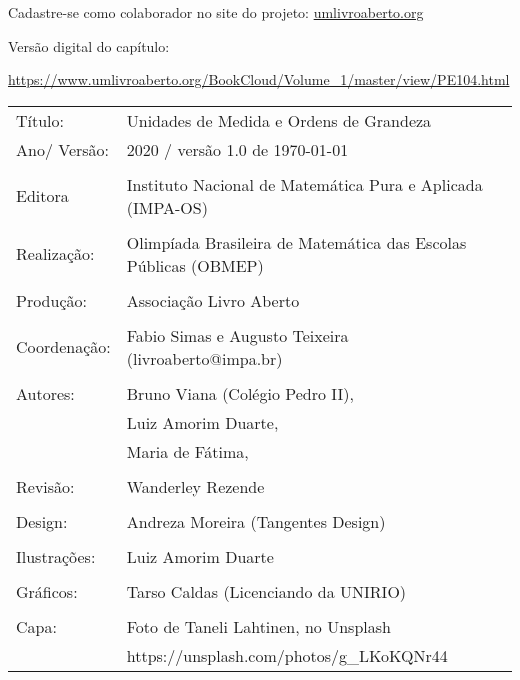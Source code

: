 Cadastre-se como colaborador no site do projeto: \url{umlivroaberto.org}

Versão digital do capítulo:

\url{https://www.umlivroaberto.org/BookCloud/Volume_1/master/view/PE104.html}


\begin{tabular}{p{}p{}}
Título: & Unidades de Medida e Ordens de Grandeza\\
Ano/ Versão: & 2020 / versão 1.0 de \today\\
\\
Editora & Instituto Nacional de Matem\'atica Pura e Aplicada (IMPA-OS)\\
\\
Realização:& Olimp\'iada Brasileira de Matem\'atica das Escolas P\'ublicas (OBMEP)\\
\\
Produção:& Associação Livro Aberto\\
\\
Coordenação: & Fabio Simas e Augusto Teixeira (livroaberto@impa.br)\\
\\
Autores: & Bruno Viana (Colégio Pedro II), \\
 		 & Luiz Amorim Duarte, \\
 		 & Maria de Fátima,\\
\\
Revisão: & Wanderley Rezende \\
\\
Design: & Andreza Moreira (Tangentes Design) \\
\\
Ilustrações: & Luiz Amorim Duarte \\ 
\\
Gráficos: & Tarso Caldas (Licenciando da UNIRIO) \\
\\
Capa: & Foto de Taneli Lahtinen, no Unsplash \\
	  & https://unsplash.com/photos/g\_LKoKQNr44 \\

\end{tabular}
\vspace{.5cm}



